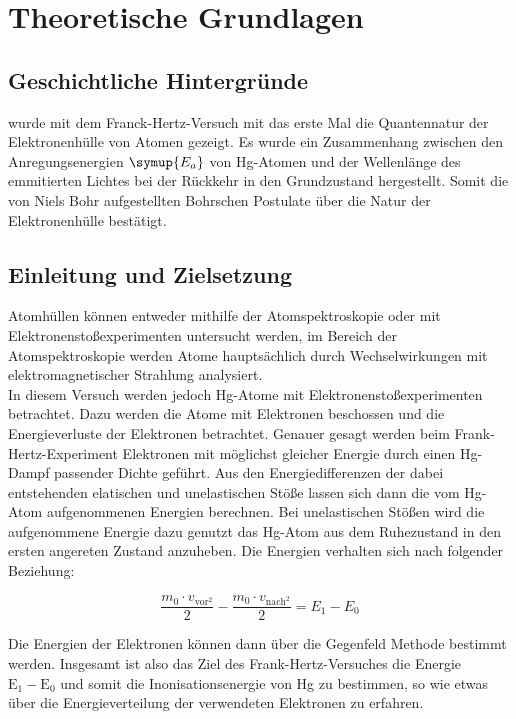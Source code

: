 \section{Theoretische Grundlagen}

    \subsection{Geschichtliche Hintergründe}

         wurde mit dem Franck-Hertz-Versuch mit das erste Mal die Quantennatur der Elektronenhülle von Atomen gezeigt. Es wurde ein 
        Zusammenhang zwischen den Anregungsenergien $\symup{E_a}$ von Hg-Atomen und der Wellenlänge des emmitierten Lichtes bei der Rückkehr 
        in den Grundzustand hergestellt. Somit die von Niels Bohr aufgestellten Bohrschen Postulate über die Natur der Elektronenhülle 
        bestätigt. 

    \subsection{Einleitung und Zielsetzung}

        \noindent Atomhüllen können entweder mithilfe der Atomspektroskopie oder mit Elektronenstoßexperimenten untersucht werden, im Bereich der 
        Atomspektroskopie werden Atome hauptsächlich durch Wechselwirkungen mit elektromagnetischer Strahlung analysiert.\\
        \noindent In diesem Versuch werden jedoch Hg-Atome mit Elektronenstoßexperimenten betrachtet. Dazu werden die Atome mit Elektronen 
        beschossen und die Energieverluste der Elektronen betrachtet. Genauer gesagt werden beim Frank-Hertz-Experiment Elektronen mit 
        möglichst gleicher Energie durch einen Hg-Dampf passender Dichte geführt. Aus den Energiedifferenzen der dabei entstehenden elatischen 
        und unelastischen Stöße lassen sich dann die vom Hg-Atom aufgenommenen Energien berechnen. Bei unelastischen Stößen wird die 
        aufgenommene Energie dazu genutzt das Hg-Atom aus dem Ruhezustand in den ersten angereten Zustand anzuheben. Die Energien verhalten sich 
        nach folgender Beziehung:

        \begin{equation*}
            \frac{m_0 \cdot v_{\text{vor}^2}}{2} - \frac{m_0 \cdot v_{\text{nach}^2}}{2} = E_1 - E_0
        \end{equation*}

        \noindent Die Energien der Elektronen können dann über die Gegenfeld Methode bestimmt werden.
        Insgesamt ist also das Ziel des Frank-Hertz-Versuches die Energie $\text{E}_1 - \text{E}_0$ und somit die Inonisationsenergie von Hg zu bestimmen, 
        so wie etwas über die Energieverteilung der verwendeten Elektronen zu erfahren.

